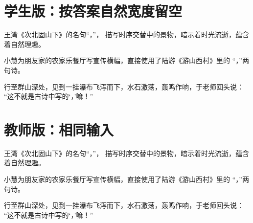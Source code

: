 \documentclass{exam-zh}
\begin{document}
\section*{学生版：按答案自然宽度留空}

\begin{question}
  王湾《次北固山下》的名句“\fillin[海日生残夜]，\fillin[江春入旧年]”，
  描写时序交替中的景物，暗示着时光流逝，蕴含着自然理趣。
\end{question}

\begin{question}
  小慧为朋友家的农家乐餐厅写宣传横幅，直接使用了陆游《游山西村》里的
  “\fillin[山重水复疑无路]，\fillin[柳暗花明又一村]”两句诗。
\end{question}

\begin{question}
  行至群山深处，见到一挂瀑布飞泻而下，水石激荡，轰鸣作响，于老师回头说：
  “这不就是古诗中写的‘\fillin[飞流直下三千尺]，\fillin[疑是银河落九天]’嘛！”
\end{question}

\section*{教师版：相同输入}


\begin{question}
  王湾《次北固山下》的名句“\fillin[海日生残夜]，\fillin[江春入旧年]”，
  描写时序交替中的景物，暗示着时光流逝，蕴含着自然理趣。
\end{question}

\begin{question}
  小慧为朋友家的农家乐餐厅写宣传横幅，直接使用了陆游《游山西村》里的
  “\fillin[山重水复疑无路]，\fillin[柳暗花明又一村]”两句诗。
\end{question}

\begin{question}
  行至群山深处，见到一挂瀑布飞泻而下，水石激荡，轰鸣作响，于老师回头说：
  “这不就是古诗中写的‘\fillin[飞流直下三千尺]，\fillin[疑是银河落九天]’嘛！”
\end{question}
\end{document}
